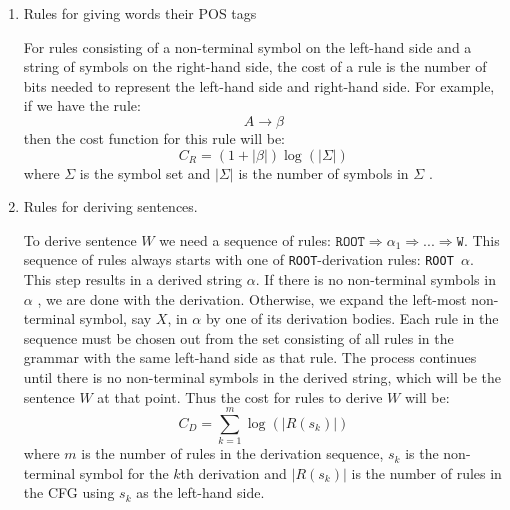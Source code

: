 \documentclass[paper=a4, fontsize=11pt]{scrartcl} %
\numberwithin{equation}{section} %
\numberwithin{figure}{section} %
\numberwithin{table}{section} %
\begin{document}
\begin{enumerate}[1.]
\item Rules for giving words their POS tags

For rules consisting of a non-terminal symbol on the left-hand side and a string of symbols on the right-hand side, the cost of a rule is the number of bits needed to represent the left-hand side and right-hand side. For example, if we have the rule:
\begin{equation}\label{first}
A  \rightarrow \beta
\end{equation}
then the cost function for this rule will be:
\begin{equation}\label{first}
C_R = (1+\lvert\beta\rvert) \log(\lvert\Sigma\rvert)
\end{equation}
where \begin{math} \Sigma \end{math}  is the symbol set and \begin{math} \lvert\Sigma\rvert \end{math} is the number of symbols in \begin{math} \Sigma \end{math} .
\item Rules for deriving sentences.

To derive sentence $W$ we need a sequence of rules: \begin{math} \texttt{ROOT} \Rightarrow \alpha_1 \Rightarrow ... \Rightarrow \texttt{W} \end{math}. This sequence of rules always starts with one of \texttt{ROOT}-derivation rules: \texttt{ROOT \textrightarrow $\alpha$}. This step results in a derived string \begin{math} \alpha \end{math}. If there is no non-terminal symbols in \begin{math} \alpha \end{math} , we are done with the derivation. Otherwise, we expand the left-most non-terminal symbol, say $X$, in \begin{math} \alpha \end{math} by one of its derivation bodies. Each rule in the sequence must be chosen out from the set consisting of all rules in the grammar with the same left-hand side as that rule. The process continues until there is no non-terminal symbols in the derived string, which will be the sentence $W$ at that point. Thus the cost for rules to derive $W$ will be:
\begin{equation}\label{first}
C_D = \sum \limits_{k=1}^m \log(\lvert R(s_k)\rvert)
\end{equation}
where $m$ is the number of rules in the derivation sequence, \begin{math} s_k \end{math} is the non-terminal symbol for the $k$th derivation and \begin{math} \lvert R(s_k)\rvert \end{math} is the number of rules in the CFG using \begin{math} s_k \end{math} as the left-hand side.
\end{enumerate}
\end{document}

